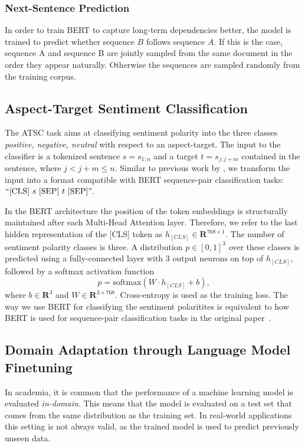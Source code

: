 \documentclass[11pt,a4paper]{article}
\newcommand{\rood}[1]{}
\begin{document}
\subsubsection*{Next-Sentence Prediction}
In order to train BERT to capture long-term dependencies better, the
model is trained to predict whether sequence $B$ follows sequence $A$. If
this is the case, sequence A and sequence B are jointly sampled from
the same document in the order they appear naturally. Otherwise
the sequences are sampled randomly from the training corpus.

\subsection{Aspect-Target Sentiment Classification}
\rood{Outcome: Readers should understand how we use a linear pooling layer on top of bert and that has been used by 2 other papers in a similar manner.
}

The ATSC task aims at classifying sentiment polarity into the three classes \textit{positive, negative, neutral} with respect to an aspect-target.
The input to the classifier is a tokenized sentence $s=s_{1:n}$ and a target $t=s_{j:j+m}$ contained in the sentence, where $j < j+m \leq n$.
Similar to previous work by \citet{Sun2019}, we transform the input into a format compatible with BERT sequence-pair classification tasks:
$``\textrm{[CLS]} \ s \ \textrm{[SEP]} \ t \ \textrm{[SEP]}"$.

In the BERT architecture the position of the token embeddings is structurally maintained after each Multi-Head Attention layer. Therefore, we refer to the last hidden representation of the [CLS] token as $h_{[CLS]} \in \mathbf{R}^{768 \times 1}$.
The number of sentiment polarity classes is three. A distribution $p \in [0,1]^3$ over these classes is predicted using a fully-connected layer with 3 output neurons on top of $h_{[CLS]}$, followed by a softmax activation function
\[ p = \textrm{softmax}(W \cdot h_{[CLS]} + b)\textrm{,} \]
where $b \in \mathbf{R}^3$ and $W \in \mathbf{R}^{3 \times 768}$.
Cross-entropy is used as the training loss. The way we use BERT for classifying the sentiment polaritites is equivalent to how BERT is used for sequence-pair classification tasks in the original paper~\cite{Devlin2019}.

\subsection{Domain Adaptation through Language Model Finetuning}
\rood{Outcome: Reader should understand in detail that we train on many variants
  in order to check performance}
In academia, it is common that the performance of a machine learning model is evaluated \textit{in-domain}. This means that the model is evaluated on a test set that comes from the same distribution as the training set. In real-world applications this setting is not always valid, as the trained model is used to predict previously unseen data.
\end{document}
